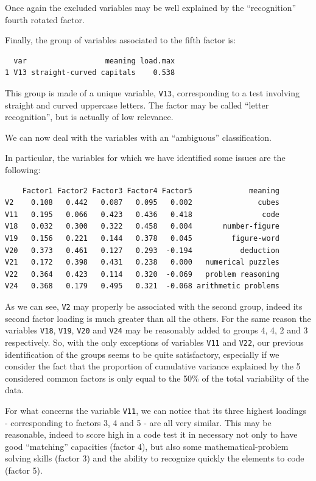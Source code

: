 \documentclass[
  letterpaper,
  DIV=11,
  numbers=noendperiod]{scrartcl}
\begin{document}
Once again the excluded variables may be well explained by the
``recognition'' fourth rotated factor.

Finally, the group of variables associated to the fifth factor is:

\begin{verbatim}
  var                  meaning load.max
1 V13 straight-curved capitals    0.538
\end{verbatim}

This group is made of a unique variable, \texttt{V13}, corresponding to
a test involving straight and curved uppercase letters. The factor may
be called ``letter recognition'', but is actually of low relevance.

We can now deal with the variables with an ``ambiguous'' classification.

In particular, the variables for which we have identified some issues
are the following:

\begin{verbatim}
    Factor1 Factor2 Factor3 Factor4 Factor5             meaning
V2    0.108   0.442   0.087   0.095   0.002               cubes
V11   0.195   0.066   0.423   0.436   0.418                code
V18   0.032   0.300   0.322   0.458   0.004       number-figure
V19   0.156   0.221   0.144   0.378   0.045         figure-word
V20   0.373   0.461   0.127   0.293  -0.194           deduction
V21   0.172   0.398   0.431   0.238   0.000   numerical puzzles
V22   0.364   0.423   0.114   0.320  -0.069   problem reasoning
V24   0.368   0.179   0.495   0.321  -0.068 arithmetic problems
\end{verbatim}

As we can see, \texttt{V2} may properly be associated with the second
group, indeed its second factor loading is much greater than all the
others. For the same reason the variables \texttt{V18}, \texttt{V19},
\texttt{V20} and \texttt{V24} may be reasonably added to groups 4, 4, 2
and 3 respectively. So, with the only exceptions of variables
\texttt{V11} and \texttt{V22}, our previous identification of the groups
seems to be quite satisfactory, especially if we consider the fact that
the proportion of cumulative variance explained by the 5 considered
common factors is only equal to the 50\% of the total variability of the
data.

For what concerns the variable \texttt{V11}, we can notice that its
three highest loadings - corresponding to factors 3, 4 and 5 - are all
very similar. This may be reasonable, indeed to score high in a code
test it in necessary not only to have good ``matching'' capacities
(factor 4), but also some mathematical-problem solving skills (factor 3)
and the ability to recognize quickly the elements to code (factor 5).
\end{document}
